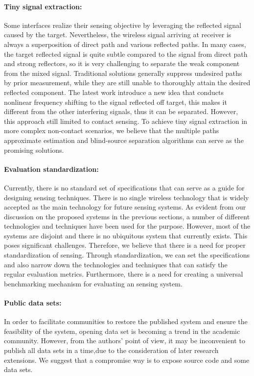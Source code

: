\paragraph*{Tiny signal extraction:} Some interfaces realize their sensing objective by leveraging the reflected signal caused by the target. Nevertheless, the wireless signal arriving at receiver is always a superposition of  direct path and various reflected paths. In many cases, the target reflected signal is quite subtle compared to the signal from direct path and strong reflectors, so it is very challenging to separate the weak component from the mixed signal. Traditional solutions generally suppress undesired paths by prior measurement, while they are still unable to thoroughly attain the desired reflected component. The latest work introduce a new idea that conducts nonlinear frequency shifting to the signal reflected off target, this makes it different from the other interfering signals, thus it can be separated. However, this approach still limited to contact sensing. To achieve tiny signal extraction in more complex non-contact scenarios, we believe that the multiple paths approximate estimation and blind-source separation algorithms can serve as the promising solutions.

\paragraph*{Evaluation standardization:} Currently, there is no standard set of specifications that can serve as a guide for designing sensing techniques. There is no single wireless technology that is widely accepted as the main technology for future sensing systems. As evident from our discussion on the proposed systems in the previous sections, a number of different technologies and techniques have been used for the purpose. However, most of the systems are disjoint and there is no ubiquitous system that currently exists. This poses significant challenges. Therefore, we believe that there is a need for proper standardization of sensing. Through standardization, we can set the specifications and also narrow down the technologies and techniques that can satisfy the regular evaluation metrics. Furthermore, there is a need for creating a universal benchmarking mechanism for evaluating an sensing system.

\paragraph*{Public data sets: }In order to facilitate communities to restore the published system and ensure the feasibility of the system, opening data set is becoming a trend in the academic community. However, from the authors' point of view, it may be inconvenient to publish all data sets in a time,due to the consideration of later research extensions. We suggest that a compromise way is to expose source code and some data sets.
